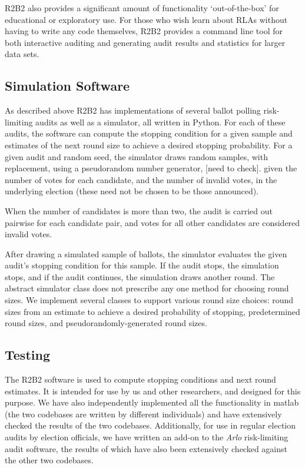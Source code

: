 R2B2 also provides a significant amount of functionality `out-of-the-box' for educational
or exploratory use. For those who wish learn about RLAs without having to write any
code themselves, R2B2 provides a command line tool for both interactive auditing and
generating audit results and statistics for larger data sets.

\subsection{Simulation Software}
As described above R2B2 has implementations of several ballot polling risk-limiting audits as well as a simulator, 
all written in Python.
For each of these audits, the software can compute the stopping condition for a given sample and estimates
of the next round size to achieve a desired stopping probability. 
For a given audit and random seed, the simulator draws random samples, with replacement, using a pseudorandom number generator, [need to check].
given the number of votes for each candidate, and the number of invalid votes, in the underlying election (these need not be chosen to be those announced). 

When the number of candidates is more than two, the audit is carried out pairwise for each candidate pair, and votes for all other candidates are considered invalid votes. 

After drawing a simulated sample of ballots, the simulator evaluates the given audit's stopping condition for this sample.
If the audit stops, the simulation stops, and if the audit continues, the simulation draws another round. 
The abstract simulator class does not prescribe any one method for choosing round sizes. 
We implement several classes to support various round size choices: 
round sizes from an estimate to achieve a desired probability of stopping, 
predetermined round sizes, and pseudorandomly-generated round sizes. 

\subsection{Testing}

The R2B2 software is used to compute stopping conditions and next round estimates. It is intended for use by us and other researchers, and designed for this purpose. We have also independently implemented all the functionality in matlab \cite{brla_explore_anon} (the two codebases are written by different individuals) and have extensively checked the results of the two codebases. Additionally, for use in regular election audits by election officials, we have written an add-on \cite{athena_anon} to the {\em Arlo} risk-limiting audit software, the results of which have also been extensively checked against the other two codebases. 


